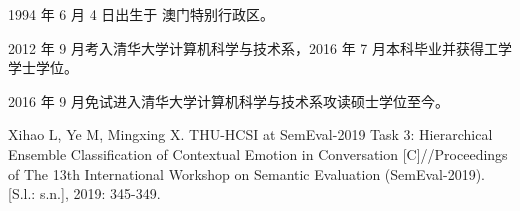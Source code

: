 \begin{resume}


  1994 年 6 月 4 日出生于 澳门特别行政区。

  2012 年 9 月考入清华大学计算机科学与技术系，2016 年 7 月本科毕业并获得工学学士学位。

  2016 年 9 月免试进入清华大学计算机科学与技术系攻读硕士学位至今。




  \begin{publications}[before=\publicationskip,after=\publicationskip]

    \item Xihao L, Ye M, Mingxing X. THU-HCSI at SemEval-2019 Task 3: Hierarchical Ensemble Classification of Contextual Emotion in Conversation [C]//Proceedings of The 13th International Workshop on Semantic Evaluation (SemEval-2019). [S.l.: s.n.], 2019: 345-349.

  \end{publications}



\end{resume}
